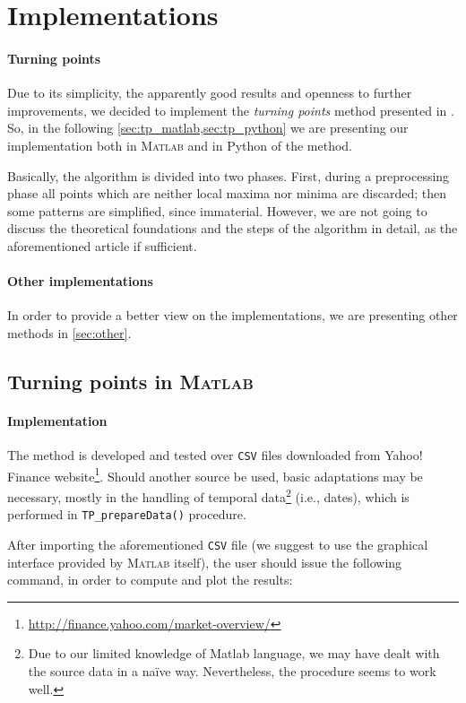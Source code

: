 \documentclass[a4paper]{article}
\newcommand{\matlab}{\textsc{Matlab}\xspace}
\newcommand{\csv}{\texttt{CSV}\xspace}
\begin{document}
\section{Implementations}\label{sec:implementations}

\paragraph{Turning points} Due to its simplicity, the apparently good results and openness to further improvements, we decided to implement the \emph{turning points} method presented in \cite{5961935}. So, in the following \cref{sec:tp_matlab,sec:tp_python} we are presenting our implementation both in \matlab and in Python of the method.

Basically, the algorithm is divided into two phases. First, during a preprocessing phase all points which are neither local maxima nor minima are discarded; then some patterns are simplified, since immaterial. However, we are not going to discuss the theoretical foundations and the steps of the algorithm in detail, as the aforementioned article if sufficient.

\paragraph{Other implementations} In order to provide a better view on the implementations, we are presenting other methods in \cref{sec:other}.



\subsection{Turning points in \matlab}\label{sec:tp_matlab}

\paragraph{Implementation} The method is developed and tested over \csv files downloaded from Yahoo! Finance website\footnote{\url{http://finance.yahoo.com/market-overview/}}. Should another source be used, basic adaptations may be necessary, mostly in the handling of temporal data\footnote{Due to our limited knowledge of Matlab language, we may have dealt with the source data in a na{\"i}ve way. Nevertheless, the procedure seems to work well.} (i.e., dates), which is performed in \texttt{TP\_prepareData()} procedure. 

After importing the aforementioned \csv file (we suggest to use the graphical interface provided by \matlab itself), the user should issue the following command, in order to compute and plot the results: 
\end{document}

